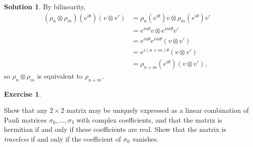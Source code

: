 \documentclass[11pt, a4paper]{report}
\theoremstyle{definition}
\newtheorem{ex}{Exercise}[part]
\newtheorem{sol}{Solution}[part]
\begin{document}
\begin{sol}

By bilinearity,
\begin{align*}
    (\rho_n \otimes \rho_m) (e^{i\theta}) (v \otimes v') &= \rho_n(e^{i\theta}) v \otimes \rho_m(e^{i\theta}) v' \\
        &= e^{in\theta} v \otimes e^{im\theta} v' \\
        &= e^{in\theta} e^{im\theta} (v \otimes v') \\
        &= e^{i(n + m)\theta} (v \otimes v') \\
        &= \rho_{n + m}(e^{i\theta}) (v \otimes v'),
\end{align*}
so $\rho_n \otimes \rho_m$ is equivalent to $\rho_{n + m}$.

\end{sol}

\begin{ex}\label{ex:paulimatrices}

Show that any $2 \times 2$ matrix may be uniquely expressed as a linear combination of Pauli matrices $\sigma_0, \ldots, \sigma_3$ with complex coefficients, and that the matrix is hermitian if and only if these coefficients are real.
Show that the matrix is \emph{traceless} if and only if the coefficient of $\sigma_0$ vanishes.

\end{ex}
\end{document}
